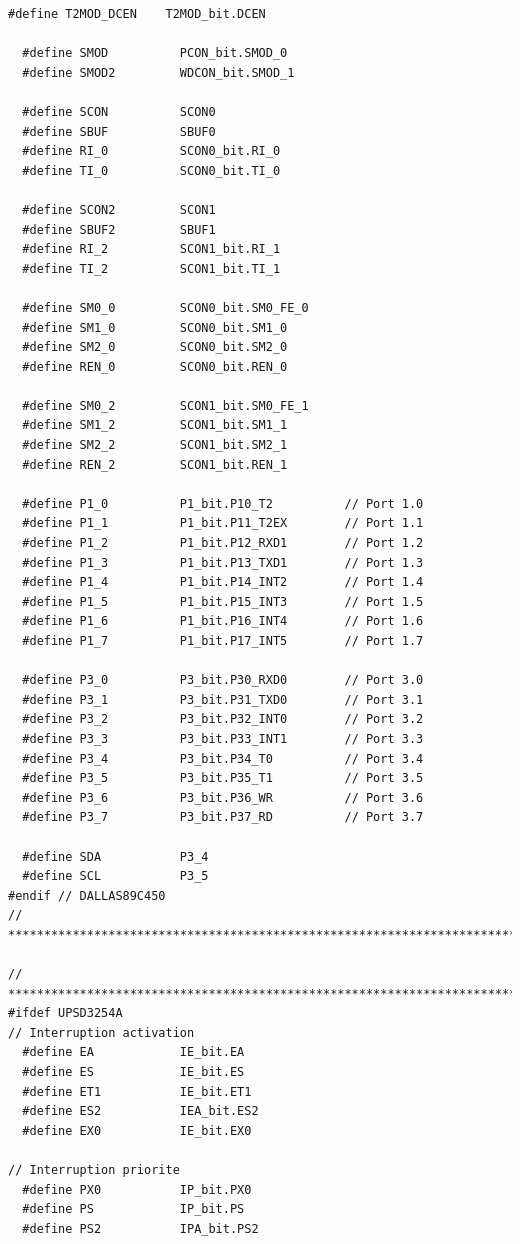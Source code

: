 \documentclass[10pt,a4paper,final]{article}
\begin{document}
\begin{lstlisting}[label={list:first},caption=Code source]
  #define T2MOD_DCEN    T2MOD_bit.DCEN

  #define SMOD          PCON_bit.SMOD_0
  #define SMOD2         WDCON_bit.SMOD_1

  #define SCON          SCON0
  #define SBUF          SBUF0
  #define RI_0          SCON0_bit.RI_0
  #define TI_0          SCON0_bit.TI_0

  #define SCON2         SCON1
  #define SBUF2         SBUF1
  #define RI_2          SCON1_bit.RI_1
  #define TI_2          SCON1_bit.TI_1

  #define SM0_0         SCON0_bit.SM0_FE_0
  #define SM1_0         SCON0_bit.SM1_0
  #define SM2_0         SCON0_bit.SM2_0
  #define REN_0         SCON0_bit.REN_0

  #define SM0_2         SCON1_bit.SM0_FE_1
  #define SM1_2         SCON1_bit.SM1_1
  #define SM2_2         SCON1_bit.SM2_1
  #define REN_2         SCON1_bit.REN_1

  #define P1_0          P1_bit.P10_T2          // Port 1.0
  #define P1_1          P1_bit.P11_T2EX        // Port 1.1
  #define P1_2          P1_bit.P12_RXD1        // Port 1.2
  #define P1_3          P1_bit.P13_TXD1        // Port 1.3
  #define P1_4          P1_bit.P14_INT2        // Port 1.4
  #define P1_5          P1_bit.P15_INT3        // Port 1.5
  #define P1_6          P1_bit.P16_INT4        // Port 1.6
  #define P1_7          P1_bit.P17_INT5        // Port 1.7

  #define P3_0          P3_bit.P30_RXD0        // Port 3.0
  #define P3_1          P3_bit.P31_TXD0        // Port 3.1
  #define P3_2          P3_bit.P32_INT0        // Port 3.2
  #define P3_3          P3_bit.P33_INT1        // Port 3.3
  #define P3_4          P3_bit.P34_T0          // Port 3.4
  #define P3_5          P3_bit.P35_T1          // Port 3.5
  #define P3_6          P3_bit.P36_WR          // Port 3.6
  #define P3_7          P3_bit.P37_RD          // Port 3.7

  #define SDA           P3_4
  #define SCL           P3_5
#endif // DALLAS89C450
// *****************************************************************************

// *****************************************************************************
#ifdef UPSD3254A
// Interruption activation
  #define EA            IE_bit.EA
  #define ES            IE_bit.ES
  #define ET1           IE_bit.ET1
  #define ES2           IEA_bit.ES2
  #define EX0           IE_bit.EX0

// Interruption priorite
  #define PX0           IP_bit.PX0
  #define PS            IP_bit.PS
  #define PS2           IPA_bit.PS2


\end{lstlisting}
\end{document}
